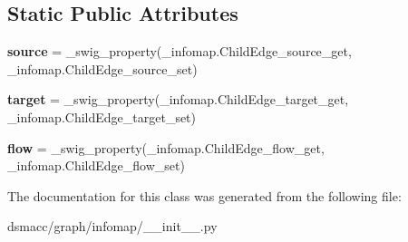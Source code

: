 \subsection*{Static Public Attributes}
\begin{DoxyCompactItemize}
\item 
\mbox{\label{classdsmacc_1_1graph_1_1infomap_1_1ChildEdge_a9a2df3b0392772c04535dbca003f5947}} 
{\bfseries source} = \+\_\+swig\+\_\+property(\+\_\+infomap.\+Child\+Edge\+\_\+source\+\_\+get, \+\_\+infomap.\+Child\+Edge\+\_\+source\+\_\+set)
\item 
\mbox{\label{classdsmacc_1_1graph_1_1infomap_1_1ChildEdge_ad2f940b81c2dec5ecac56d4b2ae3f4ea}} 
{\bfseries target} = \+\_\+swig\+\_\+property(\+\_\+infomap.\+Child\+Edge\+\_\+target\+\_\+get, \+\_\+infomap.\+Child\+Edge\+\_\+target\+\_\+set)
\item 
\mbox{\label{classdsmacc_1_1graph_1_1infomap_1_1ChildEdge_a28be6656b79abc0f3b05c4d5ea1fcd18}} 
{\bfseries flow} = \+\_\+swig\+\_\+property(\+\_\+infomap.\+Child\+Edge\+\_\+flow\+\_\+get, \+\_\+infomap.\+Child\+Edge\+\_\+flow\+\_\+set)
\end{DoxyCompactItemize}


The documentation for this class was generated from the following file\+:\begin{DoxyCompactItemize}
\item 
dsmacc/graph/infomap/\+\_\+\+\_\+init\+\_\+\+\_\+.\+py\end{DoxyCompactItemize}
